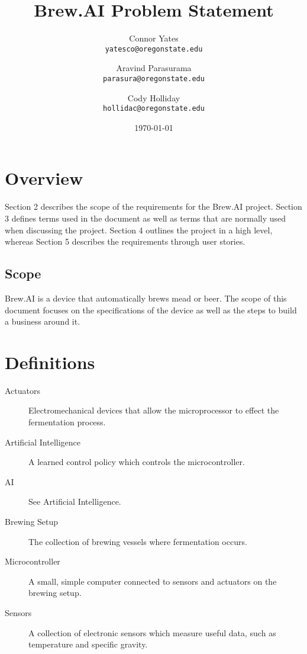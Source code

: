 \documentclass[draftclsnofoot,onecolumn,letterpaper,10pt]{IEEEtran}
\author{Connor Yates\\
\texttt{yatesco@oregonstate.edu\\}
\and
Aravind Parasurama\\
\texttt{parasura@oregonstate.edu\\}
\and
Cody Holliday\\
\texttt{hollidac@oregonstate.edu\\}}
\date{\today}
\title{Brew.AI Problem Statement}
\begin{document}
\maketitle

\newpage

\section{Overview}
Section 2 describes the scope of the requirements for the Brew.AI project.
Section 3 defines terms used in the document as well as terms that are normally used when discussing the project.
Section 4 outlines the project in a high level, whereas Section 5 describes the requirements through user stories.

\subsection{Scope}
Brew.AI is a device that automatically brews mead or beer.
The scope of this document focuses on the specifications of the device as well as the steps to build a business around it.


\section{Definitions}
\begin{description}
	\item[Actuators] Electromechanical devices that allow the microprocessor to effect the fermentation process.
	\item[Artificial Intelligence] A learned control policy which controls the microcontroller.
	\item[AI] See Artificial Intelligence.
	\item[Brewing Setup] The collection of brewing vessels where fermentation occurs.
	\item[Microcontroller] A small, simple computer connected to sensors and actuators on the brewing setup.
	\item[Sensors] A collection of electronic sensors which measure useful data, such as temperature and specific gravity.
\end{description}
\end{document}
